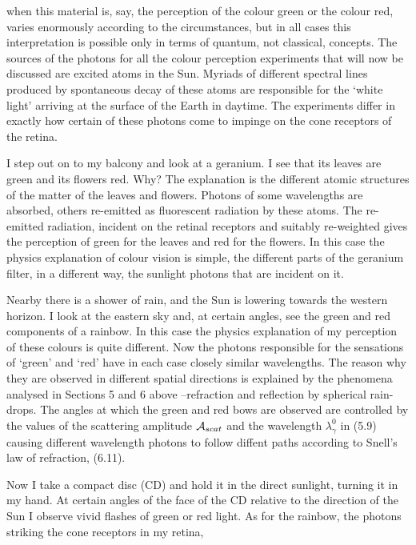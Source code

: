 \documentclass [12pt]{article}
\begin{document}
{    when this material is, say, the perception of the colour green or the colour red, varies 
     enormously according to the circumstances, but in all cases  this interpretation is possible only in
    terms of quantum, not classical, concepts. The sources of the photons for all the colour perception
    experiments that will now be discussed are excited atoms in the Sun. Myriads of different spectral
  lines produced by spontaneous decay of these atoms are responsible for the `white light' arriving at the
   surface of the Earth in daytime. The experiments differ in exactly how certain of these photons come to impinge
    on the cone receptors of the retina.
    \par I step out on to my balcony and look at a geranium. I see that its leaves are green and its flowers
    red. Why? The explanation is the different atomic structures of the matter of the leaves and flowers.
    Photons of some wavelengths are absorbed, others re-emitted as fluorescent radiation by these atoms.
    The re-emitted radiation, incident on the retinal receptors and suitably re-weighted gives the perception
   of green for the leaves and red for the flowers. In this case the physics explanation of colour vision
    is simple, the different parts of the geranium filter, in a different way, the sunlight photons that are incident
    on it.
    \par Nearby there is a shower of rain, and the Sun is lowering towards the western horizon. I look at the
    eastern sky and, at certain angles, see the green and red components of a rainbow. In this case
    the physics explanation of my perception of these colours is quite different. Now the photons responsible
  for the sensations of `green' and `red' have in each case closely similar wavelengths. The reason
   why they are observed in different spatial directions is explained by the phenomena analysed in Sections 5 and 6
   above --refraction and reflection by spherical rain-drops. The angles at which the green and red bows are 
    observed are controlled by the values of the scattering amplitude ${\cal A}_{scat}$ and the 
    wavelength $\lambda_{\gamma}^0$ in (5.9) causing different wavelength photons to follow diffent paths
    according to Snell's law of refraction, (6.11).
    \par Now I take a compact disc (CD) and hold it in the direct sunlight, turning it in my hand. 
     At certain angles of the face of the CD relative to the direction of the Sun I observe vivid flashes of
    green or red light. As for the rainbow, the photons striking the cone receptors in my retina,
}
\end{document}
